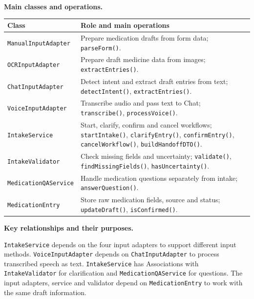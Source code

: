 
\noindent\textbf{Main classes and operations.}\par\smallskip
\begingroup\small
\begin{tabularx}{\textwidth}{|L{0.37\textwidth}|Y|}
\hline
\textbf{Class} & \textbf{Role and main operations} \\ \hline
\texttt{ManualInputAdapter} & Prepare medication drafts from form data; \texttt{parseForm()}. \\ \hline
\texttt{OCRInputAdapter} & Prepare draft medicine data from images; \texttt{extractEntries()}. \\ \hline
\texttt{ChatInputAdapter} & Detect intent and extract draft entries from text; \texttt{detectIntent()}, \texttt{extractEntries()}. \\ \hline
\texttt{VoiceInputAdapter} & Transcribe audio and pass text to Chat; \texttt{transcribe()}, \texttt{processVoice()}. \\ \hline
\texttt{IntakeService} & Start, clarify, confirm and cancel workflows; \texttt{startIntake()}, \texttt{clarifyEntry()}, \texttt{confirmEntry()}, \texttt{cancelWorkflow()}, \texttt{buildHandoffDTO()}. \\ \hline
\texttt{IntakeValidator} & Check missing fields and uncertainty; \texttt{validate()}, \texttt{findMissingFields()}, \texttt{hasUncertainty()}. \\ \hline
\texttt{MedicationQAService} & Handle medication questions separately from intake; \texttt{answerQuestion()}. \\ \hline
\texttt{MedicationEntry} & Store raw medication fields, source and status; \texttt{updateDraft()}, \texttt{isConfirmed()}. \\ \hline
\end{tabularx}
\endgroup

\noindent\textbf{Key relationships and their purposes.}\par\smallskip
\texttt{IntakeService} depends on the four input adapters to support
different input methods. \texttt{VoiceInputAdapter} depends on
\texttt{ChatInputAdapter} to process transcribed speech as text.
\texttt{IntakeService} has Associations with \texttt{IntakeValidator}
for clarification and \texttt{MedicationQAService} for questions.
The input adapters, service and validator depend on \texttt{MedicationEntry}
to work with the same draft information.

